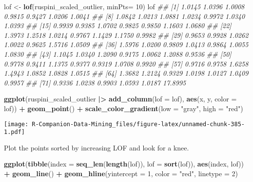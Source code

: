 \documentclass[
  notitlepage]{book}
\newenvironment{Shaded}{\begin{snugshade}}{\end{snugshade}}
\newcommand{\CommentTok}[1]{\textcolor[rgb]{0.56,0.35,0.01}{\textit{#1}}}
\newcommand{\DataTypeTok}[1]{\textcolor[rgb]{0.13,0.29,0.53}{#1}}
\newcommand{\DecValTok}[1]{\textcolor[rgb]{0.00,0.00,0.81}{#1}}
\newcommand{\ErrorTok}[1]{\textcolor[rgb]{0.64,0.00,0.00}{\textbf{#1}}}
\newcommand{\KeywordTok}[1]{\textcolor[rgb]{0.13,0.29,0.53}{\textbf{#1}}}
\newcommand{\NormalTok}[1]{#1}
\newcommand{\OperatorTok}[1]{\textcolor[rgb]{0.81,0.36,0.00}{\textbf{#1}}}
\newcommand{\StringTok}[1]{\textcolor[rgb]{0.31,0.60,0.02}{#1}}
\begin{document}
\begin{Shaded}
\begin{Highlighting}[]
\NormalTok{lof \textless{}{-}}\StringTok{ }\KeywordTok{lof}\NormalTok{(ruspini\_scaled\_outlier, }\DataTypeTok{minPts=} \DecValTok{10}\NormalTok{)}
\NormalTok{lof}
\CommentTok{\#\#  [1]  1.0145  1.0396  1.0008  0.9815  0.9427  1.0206  1.0041}
\CommentTok{\#\#  [8]  1.0842  1.0213  1.0881  1.0234  0.9972  1.0340  1.0393}
\CommentTok{\#\# [15]  0.9939  0.9385  1.0702  0.9825  0.9850  1.1603  1.0680}
\CommentTok{\#\# [22]  1.3973  1.2518  1.0214  0.9767  1.1429  1.1750  0.9982}
\CommentTok{\#\# [29]  0.9653  0.9928  1.0262  1.0022  0.9625  1.5716  1.0509}
\CommentTok{\#\# [36]  1.5976  1.0200  0.9809  1.0413  0.9864  1.0055  1.0830}
\CommentTok{\#\# [43]  1.1045  1.0340  1.2090  0.9175  1.0062  1.2088  0.9536}
\CommentTok{\#\# [50]  0.9778  0.9411  1.1375  0.9377  0.9319  1.0708  0.9920}
\CommentTok{\#\# [57]  0.9716  0.9758  1.6258  1.4943  1.0852  1.0828  1.0515}
\CommentTok{\#\# [64]  1.3682  1.2124  0.9329  1.0198  1.0127  1.0409  0.9957}
\CommentTok{\#\# [71]  0.9336  1.0238  0.9903  1.0593  1.0187 17.8995}
\end{Highlighting}
\end{Shaded}

\begin{Shaded}
\begin{Highlighting}[]
\KeywordTok{ggplot}\NormalTok{(ruspini\_scaled\_outlier }\OperatorTok{|}\ErrorTok{\textgreater{}}\StringTok{ }\KeywordTok{add\_column}\NormalTok{(}\DataTypeTok{lof =}\NormalTok{ lof), }
       \KeywordTok{aes}\NormalTok{(x, y, }\DataTypeTok{color =}\NormalTok{ lof)) }\OperatorTok{+}
\StringTok{  }\KeywordTok{geom\_point}\NormalTok{() }\OperatorTok{+}\StringTok{ }
\StringTok{  }\KeywordTok{scale\_color\_gradient}\NormalTok{(}\DataTypeTok{low =} \StringTok{"gray"}\NormalTok{, }\DataTypeTok{high =} \StringTok{"red"}\NormalTok{)}
\end{Highlighting}
\end{Shaded}

\texttt{[image: R-Companion-Data-Mining\_files/figure-latex/unnamed-chunk-385-1.pdf]}

Plot the points sorted by increasing LOF and look for a knee.

\begin{Shaded}
\begin{Highlighting}[]
\KeywordTok{ggplot}\NormalTok{(}\KeywordTok{tibble}\NormalTok{(}\DataTypeTok{index =} \KeywordTok{seq\_len}\NormalTok{(}\KeywordTok{length}\NormalTok{(lof)), }\DataTypeTok{lof =} \KeywordTok{sort}\NormalTok{(lof)), }
       \KeywordTok{aes}\NormalTok{(index, lof)) }\OperatorTok{+}
\StringTok{  }\KeywordTok{geom\_line}\NormalTok{() }\OperatorTok{+}
\StringTok{  }\KeywordTok{geom\_hline}\NormalTok{(}\DataTypeTok{yintercept =} \DecValTok{1}\NormalTok{, }\DataTypeTok{color =} \StringTok{"red"}\NormalTok{, }\DataTypeTok{linetype =} \DecValTok{2}\NormalTok{)}
\end{Highlighting}
\end{Shaded}
\end{document}
